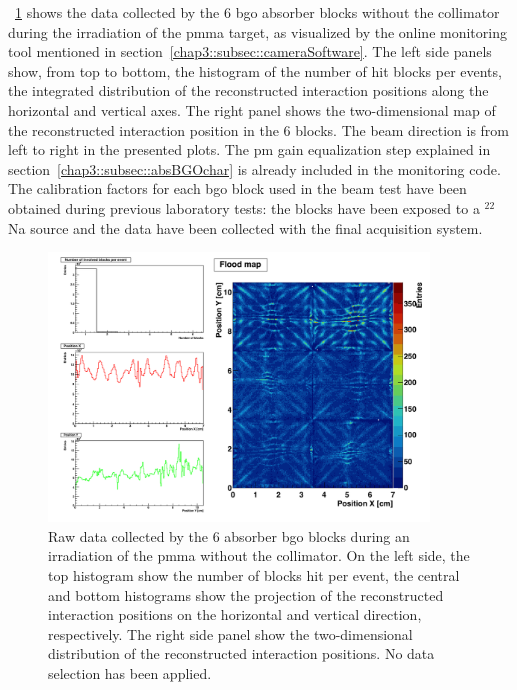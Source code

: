 \figurename~\ref{chap6::fig::september_rawNoCollimator} shows the data collected by the 6 \gls{bgo} absorber blocks without the collimator during the irradiation of the \gls{pmma} target, as visualized by the online monitoring tool mentioned in section~\ref{chap3::subsec::cameraSoftware}. The left side panels show, from top to bottom, the histogram of the number of hit blocks per events, the integrated distribution of the reconstructed interaction positions along the horizontal and vertical axes. The right panel shows the two-dimensional map of the reconstructed interaction position in the 6 blocks. The beam direction is from left to right in the presented plots. 
The \gls{pm} gain equalization step explained in section~\ref{chap3::subsec::absBGOchar} is already included in the monitoring code. The calibration factors for each \gls{bgo} block used in the beam test have been obtained during previous laboratory tests: the blocks have been exposed to a $^{22}$Na source and the data have been collected with the final acquisition system.  

\begin{figure}[!htbp]
\centering
\includegraphics[width=0.9\textwidth]{03_GraphicFiles/chapter6_BeamTests/Nice_September2018/287_complete_NOcutAppl.png}
\caption{Raw data collected by the 6 absorber \gls{bgo} blocks during an irradiation of the \gls{pmma} without the collimator. On the left side, the top histogram show the number of blocks hit per event, the central and bottom histograms show the projection of the reconstructed interaction positions on the horizontal and vertical direction, respectively. The right side panel show the two-dimensional distribution of the reconstructed interaction positions. No data selection has been applied.}
\label{chap6::fig::september_rawNoCollimator}
\end{figure}

